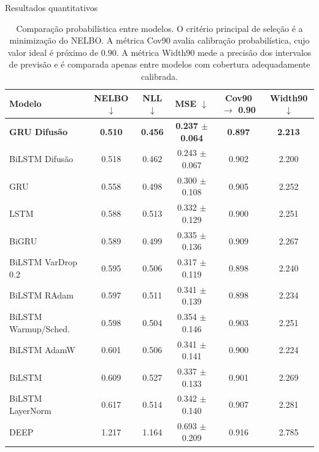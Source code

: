 \documentclass[10pt,aspectratio=169]{beamer}
\begin{document}
\begin{frame}{Resultados quantitativos}
  \begin{table}[h]
    \centering
    \small
\begin{tabular}{lccccc}
\toprule
\textbf{Modelo} 
& \textbf{NELBO $\downarrow$} 
& \textbf{NLL $\downarrow$} 
& \textbf{MSE $\downarrow$}
& \textbf{Cov90 $\rightarrow$ 0.90} 
& \textbf{Width90 $\downarrow$} \\
\midrule

\textbf{GRU Difusão}
& \textbf{0.510}
& \textbf{0.456}
& \textbf{0.237 $\pm$ 0.064} 
& \textbf{0.897}
& \textbf{2.213} \\

BiLSTM Difusão
& 0.518
& 0.462
& 0.243 $\pm$ 0.067
& 0.902 
& 2.200 \\

GRU 
& 0.558 
& 0.498 
& 0.300 $\pm$ 0.108 
& 0.905 
& 2.252 \\

LSTM 
& 0.588 
& 0.513 
& 0.332 $\pm$ 0.129 
& 0.900 
& 2.251 \\

BiGRU 
& 0.589 
& 0.499 
& 0.335 $\pm$ 0.136 
& 0.909 
& 2.267 \\

BiLSTM VarDrop 0.2 
& 0.595 
& 0.506 
& 0.317 $\pm$ 0.119 
& 0.898 
& 2.240 \\

BiLSTM RAdam 
& 0.597 
& 0.511 
& 0.341 $\pm$ 0.139 
& 0.898 
& 2.234 \\

BiLSTM Warmup/Sched. 
& 0.598 
& 0.504 
& 0.354 $\pm$ 0.146 
& 0.903 
& 2.251 \\

BiLSTM AdamW 
& 0.601 
& 0.506 
& 0.341 $\pm$ 0.141 
& 0.900 
& 2.224 \\

BiLSTM 
& 0.609 
& 0.527 
& 0.337 $\pm$ 0.133 
& 0.901 
& 2.269 \\

BiLSTM LayerNorm 
& 0.617 
& 0.514 
& 0.342 $\pm$ 0.140 
& 0.907 
& 2.281 \\

DEEP 
& 1.217 
& 1.164 
& 0.693 $\pm$ 0.209 
& 0.916 
& 2.785 \\
\bottomrule
\end{tabular}


  \caption{
Comparação probabilística entre modelos.
O critério principal de seleção é a minimização do NELBO.
A métrica Cov90 avalia calibração probabilística, cujo valor ideal é próximo de 0.90.
A métrica Width90 mede a precisão dos intervalos de previsão e é comparada apenas
entre modelos com cobertura adequadamente calibrada.
}
  \end{table}

\end{frame}
\end{document}
